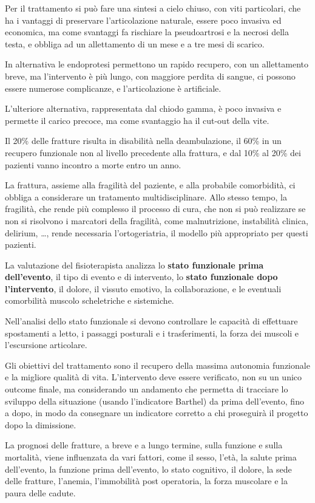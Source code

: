 Per il trattamento si può fare una sintesi a cielo chiuso, con viti particolari,
che ha i vantaggi di preservare l'articolazione naturale, essere poco invasiva
ed economica, ma come svantaggi fa rischiare la pseudoartrosi e la necrosi
della testa, e obbliga ad un allettamento di un mese e a tre mesi di scarico.

In alternativa le endoprotesi permettono un rapido recupero, con un allettamento
breve, ma l'intervento è più lungo, con maggiore perdita di sangue, ci possono
essere numerose complicanze, e l'articolazione è artificiale.

L'ulteriore alternativa, rappresentata dal chiodo gamma, è poco invasiva e
permette il carico precoce, ma come svantaggio ha il cut-out della vite.

Il 20\% delle fratture risulta in disabilità nella deambulazione, il 60\%
in un recupero funzionale non al livello precedente alla frattura, e
dal 10\% al 20\% dei pazienti vanno incontro a morte entro un anno.

La frattura, assieme alla fragilità del paziente, e alla probabile comorbidità,
ci obbliga a considerare un tratamento multidisciplinare. Allo stesso tempo,
la fragilità, che rende più complesso il processo di cura, che non si può
realizzare se non si risolvono i marcatori della fragilità, come malnutrizione,
instabilità clinica, delirium, \dots, rende necessaria l'ortogeriatria, il
modello più appropriato per questi pazienti.

La valutazione del fisioterapista analizza lo \textbf{stato funzionale prima
dell'evento}, il tipo di evento e di intervento, lo \textbf{stato funzionale
dopo l'intervento}, il dolore, il vissuto emotivo, la collaborazione, e le
eventuali comorbilità muscolo scheletriche e sistemiche.

Nell'analisi dello stato funzionale si devono controllare le capacità di
effettuare spostamenti a letto, i passaggi posturali e i trasferimenti, la forza
dei muscoli e l'escursione articolare.

Gli obiettivi del trattamento sono il recupero della massima autonomia
funzionale e la migliore qualità di vita. L'intervento deve essere verificato,
non su un unico outcome finale, ma considerando un andamento che permetta di
tracciare lo sviluppo della situazione (usando l'indicatore Barthel) da prima
dell'evento, fino a dopo, in modo da consegnare un indicatore corretto a chi
proseguirà il progetto dopo la dimissione.

La prognosi delle fratture, a breve e a lungo termine, sulla funzione e sulla
mortalità, viene influenzata da vari fattori, come il sesso, l'età, la salute
prima dell'evento, la funzione prima dell'evento, lo stato cognitivo, il dolore,
la sede delle fratture, l'anemia, l'immobilità post operatoria, la forza
muscolare e la paura delle cadute.

